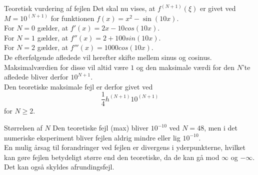 \begin{frame}{Teoretisk vurdering af fejlen}
Det skal nu vises, at $f^{(N+1)}(\xi)$ er givet ved $M=10^{(N+1)}$ for funktionen $f(x)=x^2-\sin(10x).$ \\
  For $N=0$ gælder, at $f'(x)=2x-10cos(10x)$.\\
  For $N=1$ gælder, at $f''(x)=2+100sin(10x)$.\\
  For $N=2$ gælder, at $f'''(x)=1000cos(10x)$.\\
  De efterfølgende afledede vil herefter skifte mellem sinus og cosinus.
  Maksimalværdien for disse vil altid være $1$ og den maksimale værdi for den $N$'te afledede bliver derfor $10^{N+1}$. 
\\
  Den teoretiske maksimale fejl er derfor givet ved
  $$\frac{1}{4}h^{(N+1)}10^{(N+1)}$$ for $N \geq 2$. 
\end{frame}
\begin{frame}{Størrelsen af $N$}
    Den teoretiske fejl (max) bliver $10^{-10}$ ved $N=48$, men i det numeriske eksperiment bliver fejlen aldrig mindre eller lig $10^{-10}$. \\ 
    En mulig årsag til forandringer ved fejlen er divergens i yderpunkterne, hvilket kan gøre fejlen betydeligt større end den teoretiske, da de kan gå mod $ \infty $ og $ - \infty $. Det kan også skyldes afrundingsfejl. 
  
\end{frame}